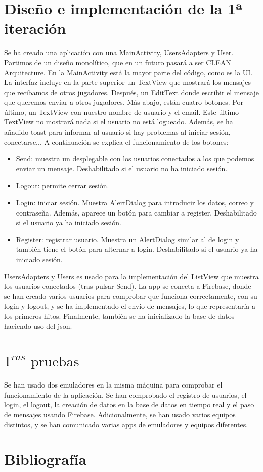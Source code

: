 \documentclass[a4paper,openright,12pt]{article}
\begin{document}
\section{Diseño e implementación de la 1ª iteración}
Se ha creado una aplicación con una MainActivity, UsersAdapters y User. Partimos de un diseño monolítico, que en un futuro pasará a ser CLEAN Arquitecture. En la MainActivity está la mayor parte del código, como es la UI. La interfaz incluye en la parte superior un TextView que mostrará los mensajes que recibamos de otros jugadores. Después, un EditText donde escribir el mensaje que queremos enviar a otros jugadores. Más abajo, están cuatro botones. Por último, un TextView con nuestro nombre de usuario y el email. Este último TextView no mostrará nada si el usuario no está logueado. Además, se ha añadido toast para informar al usuario si hay problemas al iniciar sesión, conectarse...
A continuación se explica el funcionamiento de los botones:
\begin{itemize}
    \item Send: muestra un desplegable con los usuarios conectados a los que podemos enviar un mensaje. Deshabilitado si el usuario no ha iniciado sesión.
    \item Logout: permite cerrar sesión.
    \item Login: iniciar sesión. Muestra AlertDialog para introducir los datos, correo y contraseña. Además, aparece un botón para cambiar a register. Deshabilitado si el usuario ya ha iniciado sesión.
    \item Register: registrar usuario. Muestra un AlertDialog similar al de login y también tiene el botón para alternar a login. Deshabilitado si el usuario ya ha iniciado sesión.
\end{itemize}

UsersAdapters y Users es usado para la implementación del ListView que muestra los usuarios conectados (tras pulsar Send). La app se conecta a Firebase, donde se han creado varios usuarios para comprobar que funciona correctamente, con su login y logout, y se ha implementado el envío de mensajes, lo que representaría a los primeros hitos.
Finalmente, también se ha inicializado la base de datos haciendo uso del json.

\section{$1^{ras} \text{ pruebas}$}
Se han usado dos emuladores en la misma máquina para comprobar el funcionamiento de la aplicación. Se han comprobado el registro de usuarios, el login, el logout, la creación de datos en la base de datos en tiempo real y el paso de mensajes usando Firebase. Adicionalmente, se han usado varios equipos distintos, y se han comunicado varias apps de emuladores y equipos diferentes.


\section{Bibliografía}


\end{document}
